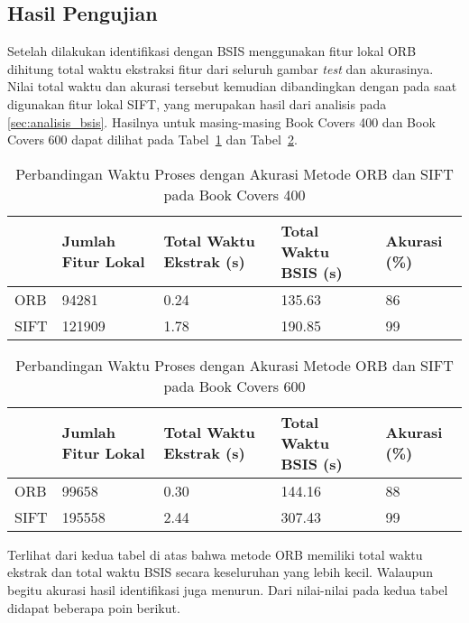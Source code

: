\subsection{Hasil Pengujian}
Setelah dilakukan identifikasi dengan BSIS menggunakan fitur lokal ORB dihitung total waktu ekstraksi fitur dari seluruh gambar \textit{test} dan akurasinya. Nilai total waktu dan akurasi tersebut kemudian dibandingkan dengan pada saat digunakan fitur lokal SIFT, yang merupakan hasil dari analisis pada \ref{sec:analisis_bsis}. Hasilnya untuk masing-masing Book Covers 400 dan Book Covers 600 dapat dilihat pada Tabel~\ref{tab:hasil_orb_dataset400} dan Tabel~\ref{tab:hasil_orb_dataset600}.
\begin{table}[H]
	\centering
	\begin{tabular}{|p{}|p{}|p{}|p{}|p{}|}
		\hline
		& \textbf{Jumlah Fitur Lokal} & \textbf{Total Waktu Ekstrak (s)} & \textbf{Total Waktu BSIS (s)} & \textbf{Akurasi (\%)} \\ \hline
		ORB  & 94281 & 0.24                             & 135.63                        & 86                    \\ \hline
		SIFT & 121909 & 1.78                             & 190.85                        & 99                    \\ \hline
	\end{tabular}
	\caption{Perbandingan Waktu Proses dengan Akurasi Metode ORB dan SIFT pada Book Covers 400}
	\label{tab:hasil_orb_dataset400}
\end{table}
\begin{table}[H]
	\centering
	\begin{tabular}{|p{}|p{}|p{}|p{}|p{}|}
		\hline
		& \textbf{Jumlah Fitur Lokal} & \textbf{Total Waktu Ekstrak (s)} & \textbf{Total Waktu BSIS (s)} & \textbf{Akurasi (\%)} \\ \hline
		ORB  & 99658 & 0.30                             & 144.16                        & 88                    \\ \hline
		SIFT & 195558 & 2.44                             & 307.43                        & 99                    \\ \hline
	\end{tabular}
	\caption{Perbandingan Waktu Proses dengan Akurasi Metode ORB dan SIFT pada Book Covers 600}
	\label{tab:hasil_orb_dataset600}
\end{table}
Terlihat dari kedua tabel di atas bahwa metode ORB memiliki total waktu ekstrak dan total waktu BSIS secara keseluruhan yang lebih kecil. Walaupun begitu akurasi hasil identifikasi juga menurun. Dari nilai-nilai pada kedua tabel didapat beberapa poin berikut.

